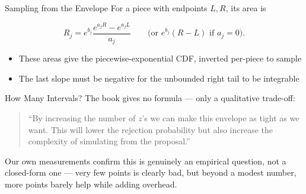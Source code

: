 \documentclass[
  ignorenonframetext,
]{beamer}
\providecommand{\tightlist}{%
  \setlength{\itemsep}{0pt}\setlength{\parskip}{0pt}}
\begin{document}
\begin{frame}{Sampling from the Envelope}
\protect{}\label{sampling-from-the-envelope}
For a piece with endpoints \(L, R\), its area is

\[
R_j = e^{b_j}\frac{e^{a_j R} - e^{a_j L}}{a_j} \qquad \text{(or } e^{b_j}(R-L) \text{ if } a_j = 0\text{)}.
\]

\begin{itemize}
\tightlist
\item
  These areas give the piecewise-exponential CDF, inverted per-piece to
  sample
\item
  The last slope must be negative for the unbounded right tail to be
  integrable
\end{itemize}
\end{frame}

\begin{frame}{How Many Intervals?}
\protect{}\label{how-many-intervals}
The book gives no formula --- only a qualitative trade-off:

\begin{quote}
``By increasing the number of \(z\)'s we can make this envelope as tight
as we want. This will lower the rejection probability but also increase
the complexity of simulating from the proposal.''
\end{quote}

Our own measurements confirm this is genuinely an empirical question,
not a closed-form one --- very few points is clearly bad, but beyond a
modest number, more points barely help while adding overhead.
\end{frame}
\end{document}
